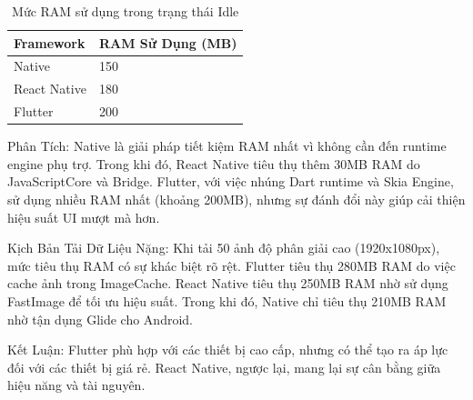     \vspace{0.5em}
    
    \begin{table}[H]
      \centering
      \begin{tabular}{|p{5cm}|p{7cm}|}
      \hline
      \textbf{Framework} & \textbf{RAM Sử Dụng (MB)} \\
      \hline
      Native       & 150 \\
      React Native & 180 \\
      Flutter      & 200 \\
      \hline
      \end{tabular}
      \caption{Mức RAM sử dụng trong trạng thái Idle}
  \end{table}
  

  
    \hspace*{0.8cm}Phân Tích:
    Native là giải pháp tiết kiệm RAM nhất vì không cần đến runtime engine phụ trợ. Trong khi đó, React Native tiêu thụ thêm 30MB RAM do JavaScriptCore và Bridge. Flutter, với việc nhúng Dart runtime và Skia Engine, sử dụng nhiều RAM nhất (khoảng 200MB), nhưng sự đánh đổi này giúp cải thiện hiệu suất UI mượt mà hơn.
  \vspace{0.5em}
  
    \hspace*{0.8cm}Kịch Bản Tải Dữ Liệu Nặng: Khi tải 50 ảnh độ phân giải cao (1920x1080px), mức tiêu thụ RAM có sự khác biệt rõ rệt. Flutter tiêu thụ 280MB RAM do việc cache ảnh trong ImageCache. React Native tiêu thụ 250MB RAM nhờ sử dụng FastImage để tối ưu hiệu suất. Trong khi đó, Native chỉ tiêu thụ 210MB RAM nhờ tận dụng Glide cho Android.
  \vspace{0.5em}

  
      \hspace*{0.8cm}Kết Luận: Flutter phù hợp với các thiết bị cao cấp, nhưng có thể tạo ra áp lực đối với các thiết bị giá rẻ. React Native, ngược lại, mang lại sự cân bằng giữa hiệu năng và tài nguyên.
  \vspace{0.5em}

